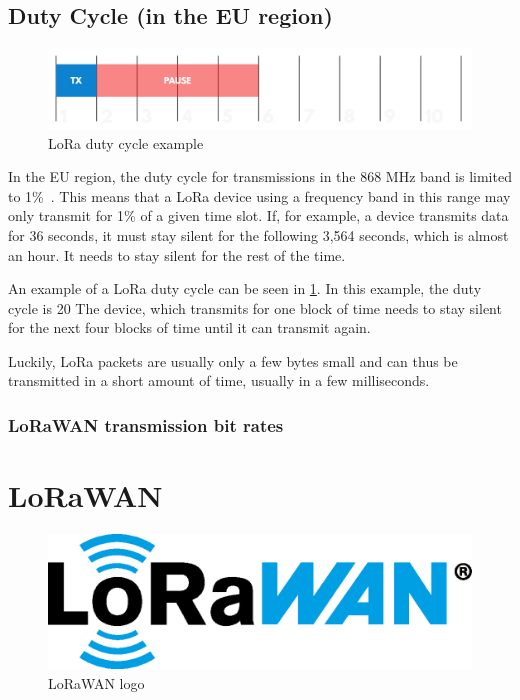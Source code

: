 \subsection{Duty Cycle (in the \acs{EU} region)}

\begin{figure}[h]
    \centering
    \includegraphics[width=.8\textwidth]{pictures/lora/duty-cycle-single-channel-off-air.png}
    \caption{\ac{LoRa} duty cycle example~\protect\cite{the_things_industries_bv_duty_nodate}}\label{pic:lora-duty-cycle}
\end{figure}

In the \ac{EU} region, the duty cycle for transmissions in the 868 MHz band is limited to 1\%~\cite{etsi_etsi_2012}.
This means that a \ac{LoRa} device using a frequency band in this range may only transmit for 1\% of a given time slot.
If, for example, a device transmits data for 36 seconds, it must stay silent for the following 3,564 seconds, which is almost an hour.
It needs to stay silent for the rest of the time.

An example of a \ac{LoRa} duty cycle can be seen in \cref{pic:lora-duty-cycle}.
In this example, the duty cycle is 20%
The device, which transmits for one block of time needs to stay silent for the next four blocks of time until it can transmit again.

Luckily, LoRa packets are usually only a few bytes small and can thus be transmitted in a short amount of time, usually in a few milliseconds.

\subsubsection{\ac{LoRaWAN} transmission bit rates}


\section{\acf{LoRaWAN}}

\begin{figure}[h]
    \centering
    \includegraphics[width=.4\textwidth]{pictures/logos/LoRaWAN_Logo.eps}
    \caption{\ac{LoRaWAN} logo~\protect\cite{lora_alliance_francais_2022}}
\end{figure}


